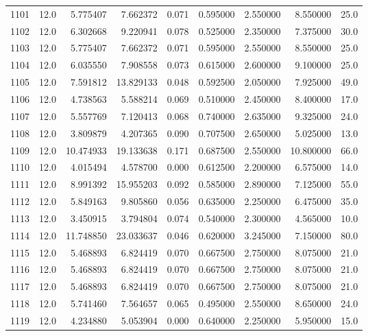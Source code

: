 \begin{tabular}{lrrrrrrrr}
1101 &   12.0 &   5.775407 &   7.662372 &  0.071 &  0.595000 &  2.550000 &   8.550000 &   25.0 \\
1102 &   12.0 &   6.302668 &   9.220941 &  0.078 &  0.525000 &  2.350000 &   7.375000 &   30.0 \\
1103 &   12.0 &   5.775407 &   7.662372 &  0.071 &  0.595000 &  2.550000 &   8.550000 &   25.0 \\
1104 &   12.0 &   6.035550 &   7.908558 &  0.073 &  0.615000 &  2.600000 &   9.100000 &   25.0 \\
1105 &   12.0 &   7.591812 &  13.829133 &  0.048 &  0.592500 &  2.050000 &   7.925000 &   49.0 \\
1106 &   12.0 &   4.738563 &   5.588214 &  0.069 &  0.510000 &  2.450000 &   8.400000 &   17.0 \\
1107 &   12.0 &   5.557769 &   7.120413 &  0.068 &  0.740000 &  2.635000 &   9.325000 &   24.0 \\
1108 &   12.0 &   3.809879 &   4.207365 &  0.090 &  0.707500 &  2.650000 &   5.025000 &   13.0 \\
1109 &   12.0 &  10.474933 &  19.133638 &  0.171 &  0.687500 &  2.550000 &  10.800000 &   66.0 \\
1110 &   12.0 &   4.015494 &   4.578700 &  0.000 &  0.612500 &  2.200000 &   6.575000 &   14.0 \\
1111 &   12.0 &   8.991392 &  15.955203 &  0.092 &  0.585000 &  2.890000 &   7.125000 &   55.0 \\
1112 &   12.0 &   5.849163 &   9.805860 &  0.056 &  0.635000 &  2.250000 &   6.475000 &   35.0 \\
1113 &   12.0 &   3.450915 &   3.794804 &  0.074 &  0.540000 &  2.300000 &   4.565000 &   10.0 \\
1114 &   12.0 &  11.748850 &  23.033637 &  0.046 &  0.620000 &  3.245000 &   7.150000 &   80.0 \\
1115 &   12.0 &   5.468893 &   6.824419 &  0.070 &  0.667500 &  2.750000 &   8.075000 &   21.0 \\
1116 &   12.0 &   5.468893 &   6.824419 &  0.070 &  0.667500 &  2.750000 &   8.075000 &   21.0 \\
1117 &   12.0 &   5.468893 &   6.824419 &  0.070 &  0.667500 &  2.750000 &   8.075000 &   21.0 \\
1118 &   12.0 &   5.741460 &   7.564657 &  0.065 &  0.495000 &  2.550000 &   8.650000 &   24.0 \\
1119 &   12.0 &   4.234880 &   5.053904 &  0.000 &  0.640000 &  2.250000 &   5.950000 &   15.0 \\

\end{tabular}
